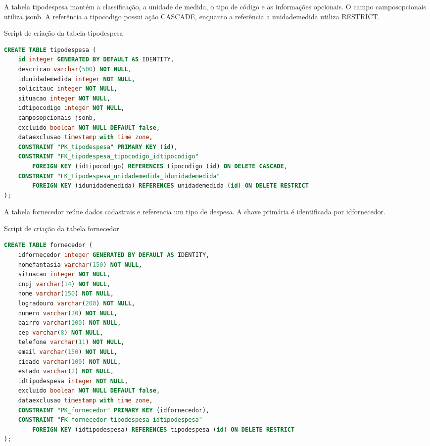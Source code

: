 A tabela tipodespesa mantém a classificação, a unidade de medida, o tipo de código e as informações opcionais. O campo camposopcionais utiliza jsonb. A referência a tipocodigo possui ação CASCADE, enquanto a referência a unidademedida utiliza RESTRICT.

\begin{quadro}[H]
\caption{Script de criação da tabela tipodespesa}\label{qua:bd-tipodespesa}
\begin{lstlisting}[language=SQL,breaklines=true,breakatwhitespace=false,frame=single,columns=fullflexible,basicstyle=\ttfamily\footnotesize]
CREATE TABLE tipodespesa (
    id integer GENERATED BY DEFAULT AS IDENTITY,
    descricao varchar(500) NOT NULL,
    idunidademedida integer NOT NULL,
    solicitauc integer NOT NULL,
    situacao integer NOT NULL,
    idtipocodigo integer NOT NULL,
    camposopcionais jsonb,
    excluido boolean NOT NULL DEFAULT false,
    dataexclusao timestamp with time zone,
    CONSTRAINT "PK_tipodespesa" PRIMARY KEY (id),
    CONSTRAINT "FK_tipodespesa_tipocodigo_idtipocodigo"
        FOREIGN KEY (idtipocodigo) REFERENCES tipocodigo (id) ON DELETE CASCADE,
    CONSTRAINT "FK_tipodespesa_unidademedida_idunidademedida"
        FOREIGN KEY (idunidademedida) REFERENCES unidademedida (id) ON DELETE RESTRICT
);
\end{lstlisting}
\end{quadro}

A tabela fornecedor reúne dados cadastrais e referencia um tipo de despesa. A chave primária é identificada por idfornecedor.

\begin{quadro}[H]
\caption{Script de criação da tabela fornecedor}\label{qua:bd-fornecedor}
\begin{lstlisting}[language=SQL,breaklines=true,breakatwhitespace=false,frame=single,columns=fullflexible,basicstyle=\ttfamily\footnotesize]
CREATE TABLE fornecedor (
    idfornecedor integer GENERATED BY DEFAULT AS IDENTITY,
    nomefantasia varchar(150) NOT NULL,
    situacao integer NOT NULL,
    cnpj varchar(14) NOT NULL,
    nome varchar(150) NOT NULL,
    logradouro varchar(200) NOT NULL,
    numero varchar(20) NOT NULL,
    bairro varchar(100) NOT NULL,
    cep varchar(8) NOT NULL,
    telefone varchar(11) NOT NULL,
    email varchar(150) NOT NULL,
    cidade varchar(100) NOT NULL,
    estado varchar(2) NOT NULL,
    idtipodespesa integer NOT NULL,
    excluido boolean NOT NULL DEFAULT false,
    dataexclusao timestamp with time zone,
    CONSTRAINT "PK_fornecedor" PRIMARY KEY (idfornecedor),
    CONSTRAINT "FK_fornecedor_tipodespesa_idtipodespesa"
        FOREIGN KEY (idtipodespesa) REFERENCES tipodespesa (id) ON DELETE RESTRICT
);
\end{lstlisting}
\end{quadro}

